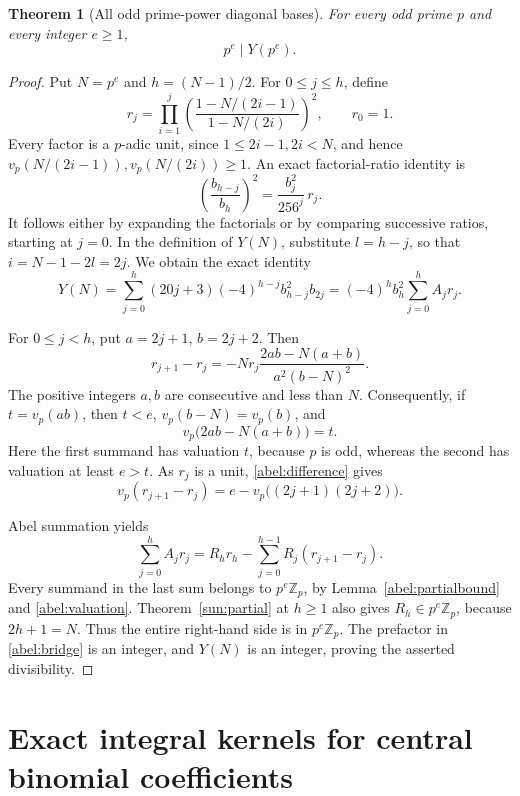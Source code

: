 \documentclass[11pt,a4paper]{article}
\newtheorem{theorem}{Theorem}[section]
\theoremstyle{remark}\newtheorem{remark}[theorem]{Remark}
\newcommand{\Z}{\mathbb Z}\newcommand{\Q}{\mathbb Q}
\begin{document}
\begin{theorem}[All odd prime-power diagonal bases]\label{abel:bases}
For every odd prime \(p\) and every integer \(e\ge1\),
\[
                              p^e\mid Y(p^e).
\]
\end{theorem}
\begin{proof}
Put \(N=p^e\) and \(h=(N-1)/2\). For \(0\le j\le h\), define
\[
 r_j=\prod_{i=1}^j
       \left(\frac{1-N/(2i-1)}{1-N/(2i)}\right)^2,
 \qquad r_0=1.
\]
Every factor is a \(p\)-adic unit, since \(1\le2i-1,2i<N\), and hence
\(v_p(N/(2i-1)),v_p(N/(2i))\ge1\).
An exact factorial-ratio identity is
\[
 \left(\frac{b_{h-j}}{b_h}\right)^2
                 =\frac{b_j^2}{256^j}\,r_j.
\]
It follows either by expanding the factorials or by comparing successive
ratios, starting at \(j=0\). In the definition of \(Y(N)\), substitute
\(l=h-j\), so that \(i=N-1-2l=2j\). We obtain the exact identity
\begin{equation}\label{abel:bridge}
 Y(N)=\sum_{j=0}^h(20j+3)(-4)^{h-j}b_{h-j}^2b_{2j}
     =(-4)^h b_h^2\sum_{j=0}^h A_jr_j.
\end{equation}

For \(0\le j<h\), put \(a=2j+1\), \(b=2j+2\). Then
\begin{equation}\label{abel:difference}
 r_{j+1}-r_j
 =-N r_j\frac{2ab-N(a+b)}{a^2(b-N)^2}.
\end{equation}
The positive integers \(a,b\) are consecutive and less than \(N\).
Consequently, if \(t=v_p(ab)\), then \(t<e\),
\(v_p(b-N)=v_p(b)\), and
\[
 v_p\bigl(2ab-N(a+b)\bigr)=t.
\]
Here the first summand has valuation \(t\), because \(p\) is odd,
whereas the second has valuation at least \(e>t\).
As \(r_j\) is a unit, \eqref{abel:difference} gives
\begin{equation}\label{abel:valuation}
 v_p(r_{j+1}-r_j)=e-v_p\bigl((2j+1)(2j+2)\bigr).
\end{equation}

Abel summation yields
\[
 \sum_{j=0}^h A_jr_j
       =R_hr_h-\sum_{j=0}^{h-1}R_j(r_{j+1}-r_j).
\]
Every summand in the last sum belongs to \(p^e\Z_p\), by
Lemma~\ref{abel:partialbound} and \eqref{abel:valuation}.
Theorem~\ref{sun:partial} at \(h\ge1\) also gives
\(R_h\in p^e\Z_p\), because \(2h+1=N\).
Thus the entire right-hand side is in \(p^e\Z_p\).
The prefactor in \eqref{abel:bridge} is an integer, and \(Y(N)\) is an
integer, proving the asserted divisibility.
\end{proof}

\section{Exact integral kernels for central binomial coefficients}
\label{sec:central-kernels}
\end{document}
